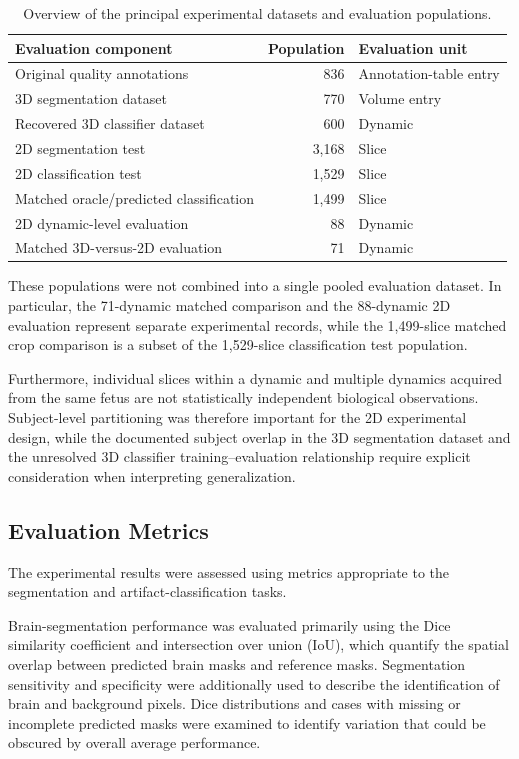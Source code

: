 \begin{table}[htbp]
\centering
\caption{Overview of the principal experimental datasets and evaluation populations.}
\label{tab:results_cohorts}
\begin{tabular}{lrl}
\hline
Evaluation component & Population & Evaluation unit \\
\hline
Original quality annotations & 836 & Annotation-table entry \\
3D segmentation dataset & 770 & Volume entry \\
Recovered 3D classifier dataset & 600 & Dynamic \\
2D segmentation test & 3,168 & Slice \\
2D classification test & 1,529 & Slice \\
Matched oracle/predicted classification & 1,499 & Slice \\
2D dynamic-level evaluation & 88 & Dynamic \\
Matched 3D-versus-2D evaluation & 71 & Dynamic \\
\hline
\end{tabular}
\end{table}

These populations were not combined into a single pooled evaluation dataset. In particular, the 71-dynamic matched comparison and the 88-dynamic 2D evaluation represent separate experimental records, while the 1,499-slice matched crop comparison is a subset of the 1,529-slice classification test population.

Furthermore, individual slices within a dynamic and multiple dynamics acquired from the same fetus are not statistically independent biological observations. Subject-level partitioning was therefore important for the 2D experimental design, while the documented subject overlap in the 3D segmentation dataset and the unresolved 3D classifier training--evaluation relationship require explicit consideration when interpreting generalization.

\subsection{Evaluation Metrics}
\label{subsec:results_evaluation_metrics}

The experimental results were assessed using metrics appropriate to the segmentation and artifact-classification tasks.

Brain-segmentation performance was evaluated primarily using the Dice similarity coefficient and intersection over union (IoU), which quantify the spatial overlap between predicted brain masks and reference masks. Segmentation sensitivity and specificity were additionally used to describe the identification of brain and background pixels. Dice distributions and cases with missing or incomplete predicted masks were examined to identify variation that could be obscured by overall average performance.

